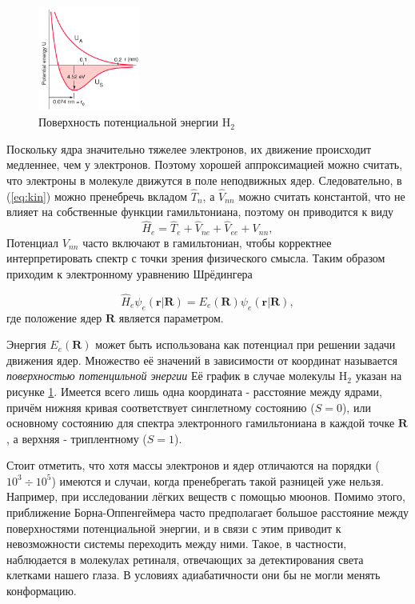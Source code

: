 \documentclass[12pt, oneside]{article}
\numberwithin{equation}{section}  %
\begin{document}
\begin{figure}
    \centering
    \includegraphics[width=0.3\textwidth]{./images/H2.png}
    \caption{Поверхность потенциальной энергии H\(_2\)}
    \label{fig:H2PPE}
\end{figure}
Поскольку ядра значительно тяжелее электронов, их движение происходит медленнее, чем у электронов. Поэтому хорошей аппроксимацией можно считать, что электроны в молекуле движутся в поле неподвижных ядер. 
Следовательно, в (\ref{eq:kin}) можно пренебречь вкладом \(\hat{T}_n\), а \(\hat{V}_{nn}\) можно считать константой, что не влияет на собственные функции гамильтониана, поэтому он приводится к виду
\begin{equation}
    \hat{H}_e = \hat{T}_e + \hat{V}_{ne} + \hat{V}_{ee} + V_{nn},
    \label{eq:H_e}
\end{equation}
Потенциал \(V_{nn}\) часто включают в гамильтониан, чтобы корректнее интерпретировать спектр с точки зрения физического смысла.
Таким образом приходим к электронному уравнению Шрёдингера

\begin{equation}
    \hat{H}_e \psi_e (\bm{r}| \bm{R} ) = E_e (\bm{R}) \psi_e (\bm{r}| \bm{R}),
    \label{eq:elH}
\end{equation}
где положение ядер \(\bm{R}\) является параметром.



Энергия \(E_e(\bm{R})\) может быть использована как потенциал при решении задачи движения ядер. Множество её значений в зависимости от координат называется \textit{поверхностью потенцильной энергии} Её график в случае молекулы H\(_2\) указан на рисунке \ref{fig:H2PPE}. Имеется всего лишь одна координата - расстояние между ядрами, причём нижняя кривая соответствует синглетному состоянию (\(S = 0\)), или основному состоянию для спектра электронного гамильтониана в каждой точке \(\bm{R}\), а верхняя - триплентному (\(S = 1\)). 

Стоит отметить, что хотя массы электронов и ядер отличаются на порядки (\(10^3 \div 10^5\)) имеются и случаи, когда пренебрегать такой разницей уже нельзя. Например, при исследовании лёгких веществ с помощью мюонов. Помимо этого, приближение Борна-Оппенгеймера часто предполагает большое расстояние между поверхностями потенциальной энергии, и в связи с этим приводит к невозможности системы переходить между ними. Такое, в частности, наблюдается в молекулах ретиналя, отвечающих за детектирования света клетками нашего глаза. В условиях адиабатичности они бы не могли менять конформацию.
\end{document}
